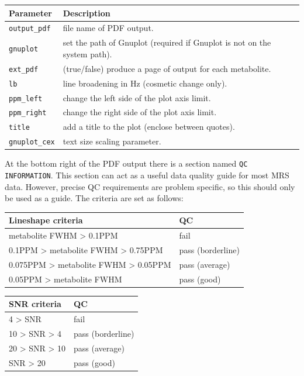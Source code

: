 \documentclass[a4paper,12pt]{article}
\begin{document}
\vspace{\baselineskip}
\begin{tabular}{l l}
Parameter & Description \\
\hline
\texttt{output\_pdf} & file name of PDF output. \\
\texttt{gnuplot} & set the path of Gnuplot (required if Gnuplot is not on the system path). \\
\texttt{ext\_pdf} & (true/false) produce a page of output for each metabolite. \\
\texttt{lb} & line broadening in Hz (cosmetic change only). \\
\texttt{ppm\_left} & change the left side of the plot axis limit. \\
\texttt{ppm\_right} & change the right side of the plot axis limit. \\
\texttt{title} & add a title to the plot (enclose between quotes). \\
\texttt{gnuplot\_cex} & text size scaling parameter. \\
\end{tabular}

\vspace{\baselineskip}
At the bottom right of the PDF output there is a section named \texttt{QC INFORMATION}. This section can act as a useful data quality guide for most MRS data. However, precise QC requirements are problem specific, so this should only be used as a guide. The criteria are set as follows:

\vspace{\baselineskip}
\begin{tabular}{l l}
Lineshape criteria & QC \\
\hline
metabolite FWHM > 0.1PPM & fail \\
0.1PPM > metabolite FWHM > 0.75PPM & pass (borderline) \\
0.075PPM > metabolite FWHM > 0.05PPM & pass (average) \\
0.05PPM > metabolite FWHM & pass (good) \\
\end{tabular}

\vspace{\baselineskip}
\begin{tabular}{l l}
SNR criteria & QC \\
\hline
4 > SNR & fail \\
10 > SNR > 4 & pass (borderline) \\
20 > SNR > 10 & pass (average) \\
SNR > 20 & pass (good) \\
\end{tabular}
\end{document}

